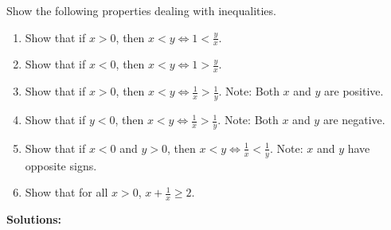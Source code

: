 \begin{example}
\label{ex:ManipulatingInequalities01}
Show the following properties dealing with inequalities.

\begin{enumerate}
\renewcommand{\labelenumi}{(\alph{enumi})}
\setlength{\itemsep}{.2cm}

\item Show that if $x>0$, then $x < y \iff 1 < \frac{y}{x}$.  

\item Show that if $x<0$, then $x < y \iff 1 > \frac{y}{x}$. 
   
\item Show that if $x>0$, then $x < y \iff \frac{1}{x} > \frac{1}{y}$.  Note: Both $x$ and $y$ are positive.

\item Show that if $y<0$, then $x < y \iff \frac{1}{x} > \frac{1}{y}$.  Note: Both $x$ and $y$ are negative.

\item Show that if $x<0$ and $y>0$, then $x < y \iff \frac{1}{x} < \frac{1}{y}$.  Note: $x$ and $y$ have opposite signs.

\item Show that for all $x>0$, $x + \frac{1}{x} \ge 2$.

\end{enumerate}    
\end{example}

\textbf{Solutions:} 

